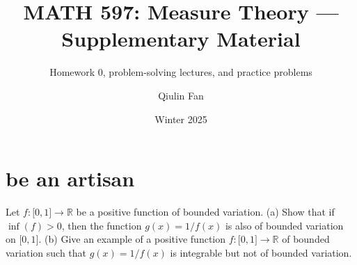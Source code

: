 \documentclass{qlnotes-export}
\title{MATH 597: Measure Theory --- Supplementary Material}
\subtitle{Homework 0, problem-solving lectures, and practice problems}
\author{Qiulin Fan}
\date{Winter 2025}
\begin{document}
\mainmatter
\chapter{be an artisan}\label{be-an-artisan}

Let \(f:\lbrack 0,1\rbrack\rightarrow{\mathbb{R}}\) be a positive function of bounded variation. (a) Show that if \(\inf(f) > 0\), then the function \(g(x) = 1/f(x)\) is also of bounded variation on \(\lbrack 0,1\rbrack\). (b) Give an example of a positive function \(f:\lbrack 0,1\rbrack\rightarrow{\mathbb{R}}\) of bounded variation such that \(g(x) = 1/f(x)\) is integrable but not of bounded variation.
\end{document}
